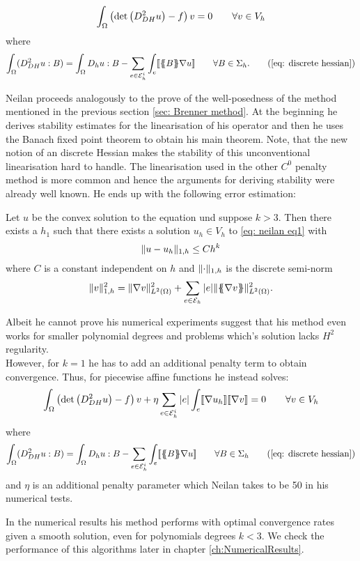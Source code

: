 \begin{align}
		\int_\Omega \left(\det{\left(D_{DH}^2 u\right)} - f \right) v = 0 \qquad \forall v \in V_h \label{eq: neilan eq1}
\end{align}
where
	\begin{align}
		\int_\Omega (D_{DH}^2 u : B) 
		= \int_\Omega D_h u: B -\sum_{ e \in \edgesi} \int_e  \jump {\average B \nabla u }\qquad \forall B \in \Sigma_h. \tag{\ref{eq: discrete hessian}}
	\end{align}

Neilan proceeds analogously to the prove of the well-posedness of the method mentioned in the previous section \ref{sec: Brenner method}. At the beginning he derives stability estimates for the linearisation of his operator and then he uses the Banach fixed point theorem to obtain his main theorem. Note, that the new notion of an discrete Hessian makes the stability of this unconventional linearisation hard to handle. The linearisation used in the other $C^0$ penalty method is more common and hence the arguments for deriving stability were already well known.
He ends up with the following error estimation:
\begin{theorem}
	Let $u$ be the convex solution to the \MA equation und suppose $k>3$. Then there exists a $h_1$ such that there exists a solution $u_h \in V_h$ to \eqref{eq: neilan eq1} with
	\[
		\lVert u-u_h \rVert_{1,h} \leq C h^k
	\]
	where $C$ is a constant independent on $h$ and $\lVert \cdot  \rVert_{1,h}$ is the discrete semi-norm 
	\[
		\lVert v \rVert_{1,h}^2 = \lVert \nabla v  \rVert^2_{L^2(\Omega)} + \sum_{e \in \mathcal{E}_h} |e| \lVert \{\!\!\{ \nabla v \}\!\!\} \rVert^2_{L^2(\Omega)}.
	\]
\end{theorem}

Albeit he cannot prove his numerical experiments suggest that his method even works for smaller polynomial degrees and problems which's solution lacks $H^2$ regularity. 
\\However, for $k=1$ he has to add an additional penalty term to obtain convergence. Thus, for piecewise affine functions he instead solves:
\begin{align}
		\int_\Omega \left(\det{\left(D_{DH}^2 u\right)} - f \right) v + \eta \sum_{e \in \mathcal{E}_h^i} |e| \int_e \llbracket  \nabla u_h \rrbracket \llbracket \nabla v \rrbracket
		= 0 \qquad \forall v \in V_h \label{eq: neilan eq1 + jump}
\end{align}
where
	\begin{align*}
		\int_\Omega (D_{DH}^2 u : B) 
		= \int_\Omega D_h u: B -\sum_{ e \in \edgesi} \int_e  \jump {\average B \nabla u }\qquad \forall B \in \Sigma_h \tag{\ref{eq: discrete hessian}}
	\end{align*}
and $\eta$ is an additional penalty parameter which Neilan takes to be 50 in his numerical tests.

In the numerical results his method performs with optimal convergence rates given a smooth solution, even for polynomials degrees $k<3$. We check the performance of this algorithms later in chapter \ref{ch:NumericalResults}.